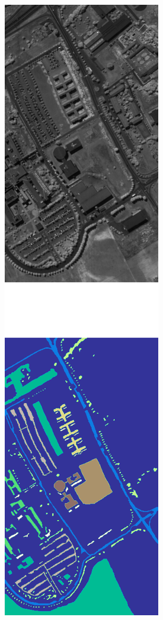 \documentclass[preprint,12pt]{elsarticle}
\begin{document}
\begin{figure}[H]
\begin{subfigure}{.20\textwidth}
		\includegraphics[height=1.5\linewidth]{../analysis/pavia_university}
		\subcaption{{\medbreak}}\label{fig:pavia_university}
	\end{subfigure}


\end{figure}
\end{document}
